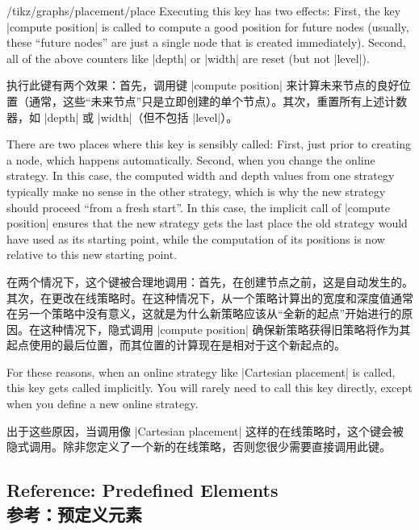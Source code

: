 \begin{key}{/tikz/graphs/placement/place}
    Executing this key has two effects: First, the key |compute position| is
    called to compute a good position for future nodes (usually, these ``future
    nodes'' are just a single node that is created immediately). Second, all of
    the above counters like |depth| or |width| are reset (but not |level|).

    执行此键有两个效果：首先，调用键 |compute position| 来计算未来节点的良好位置（通常，这些“未来节点”只是立即创建的单个节点）。其次，重置所有上述计数器，如 |depth| 或 |width|（但不包括 |level|）。


    There are two places where this key is sensibly called: First, just prior
    to creating a node, which happens automatically. Second, when you change
    the online strategy. In this case, the computed width and depth values from
    one strategy typically make no sense in the other strategy, which is why
    the new strategy should proceed ``from a fresh start''. In this case, the
    implicit call of |compute position| ensures that the new strategy gets the
    last place the old strategy would have used as its starting point, while
    the computation of its positions is now relative to this new starting
    point.

    在两个情况下，这个键被合理地调用：首先，在创建节点之前，这是自动发生的。其次，在更改在线策略时。在这种情况下，从一个策略计算出的宽度和深度值通常在另一个策略中没有意义，这就是为什么新策略应该从“全新的起点”开始进行的原因。在这种情况下，隐式调用 |compute position| 确保新策略获得旧策略将作为其起点使用的最后位置，而其位置的计算现在是相对于这个新起点的。

    For these reasons, when an online strategy like |Cartesian placement| is
    called, this key gets called implicitly. You will rarely need to call this
    key directly, except when you define a new online strategy.

    出于这些原因，当调用像 |Cartesian placement| 这样的在线策略时，这个键会被隐式调用。除非您定义了一个新的在线策略，否则您很少需要直接调用此键。


\end{key}


\subsection{Reference: Predefined Elements\\参考：预定义元素}
\label{section-library-graphs-reference}

